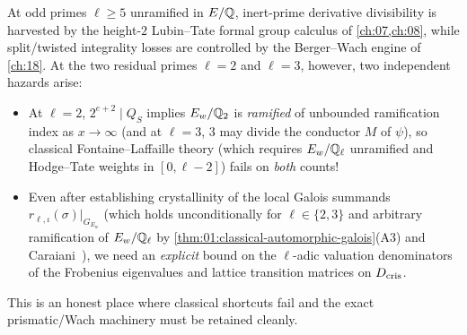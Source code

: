 At odd primes $\ell \ge 5$ unramified in $E/\mathbb{Q}$, inert-prime derivative divisibility is harvested by the height-$2$ Lubin--Tate formal group calculus of \cref{ch:07,ch:08}, while split/twisted integrality losses are controlled by the Berger--Wach engine of \cref{ch:18}. At the two residual primes $\ell = 2$ and $\ell = 3$, however, two independent hazards arise:
\begin{itemize}
\item At $\ell = 2$, $2^{e+2} \mid Q_S$ implies $E_w / \mathbb{Q}_2$ is \emph{ramified} of unbounded ramification index as $x \to \infty$ (and at $\ell = 3$, $3$ may divide the conductor $M$ of $\psi$), so classical Fontaine--Laffaille theory (which requires $E_w / \mathbb{Q}_\ell$ unramified and Hodge--Tate weights in $[0, \ell - 2]$) fails on \emph{both} counts!
\item Even after establishing crystallinity of the local Galois summands $r_{\ell, \iota}(\sigma)|_{G_{E_w}}$ (which holds unconditionally for $\ell \in \{2, 3\}$ and arbitrary ramification of $E_w/\mathbb{Q}_\ell$ by \cref{thm:01:classical-automorphic-galois}(A3) and Caraiani~\cite[Theorem~1.1]{Caraiani2014}), we need an \emph{explicit} bound on the $\ell$-adic valuation denominators of the Frobenius eigenvalues and lattice transition matrices on $D_{\mathrm{cris}}$.
\end{itemize}

This is an honest place where classical shortcuts fail and the exact prismatic/Wach machinery must be retained cleanly.


